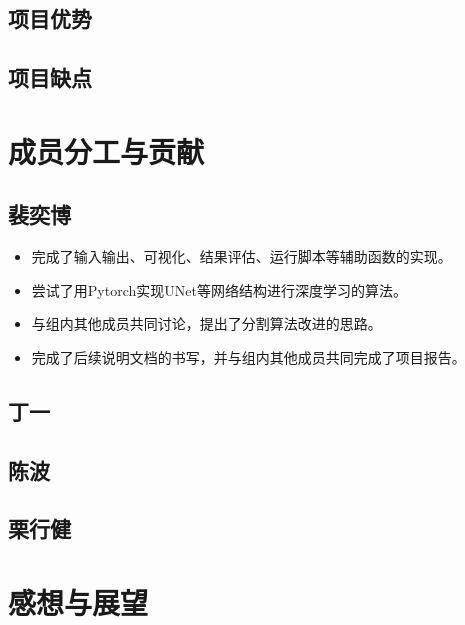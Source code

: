 \documentclass[UTF8]{ctexart}
\begin{document}
\subsection{项目优势}
\subsection{项目缺点}

\section{成员分工与贡献}
\subsection{裴奕博}
\begin{itemize}
    \item 完成了输入输出、可视化、结果评估、运行脚本等辅助函数的实现。
    \item 尝试了用Pytorch实现UNet等网络结构进行深度学习的算法。
    \item 与组内其他成员共同讨论，提出了分割算法改进的思路。
    \item 完成了后续说明文档的书写，并与组内其他成员共同完成了项目报告。
\end{itemize}
\subsection{丁一}
\subsection{陈波}
\subsection{栗行健}

\section{感想与展望}
\end{document}
